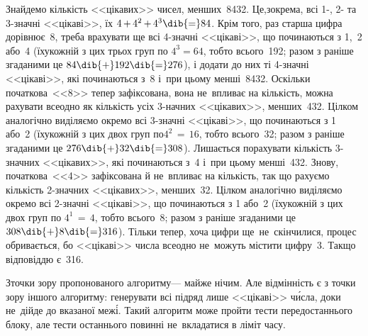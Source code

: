 Знайдемо кількість <<цікавих>> чисел, менших~8432.
Це,\nolinebreak[3] зокрема, всі 1-, 2- та \mbox{3-значні} <<цікаві>>, їх ${4\,{+}\,4^2\,{+}\,4^3}\dib{{=}}84$.
Крім того, раз старша цифра дорівнює~8, треба врахувати ще всі \mbox{4-значні} <<цікаві>>, що починаються з 1,~2 або~4 (їх\nolinebreak[3] у\nolinebreak[2] кожній з цих трьох груп по $4^3{=}64$, тобто всього~192; разом з раніше згаданими це $84\dib{{+}}192\dib{{=}}276$), і додати до них ті \mbox{4-значні} <<цікаві>>, які починаються з~8 і~при цьому менші~8432. Оскільки початкова~<<8>> тепер зафіксована, вона не~впливає на кількість, можна рахувати все\nolinebreak[2] одно як кількість усіх \mbox{3-нач}\-них <<цікавих>>, менших~432. Цілком аналогічно виділяємо окремо всі \mbox{3-значні} <<цікаві>>, що починаються з 1 або~2 (їх\nolinebreak[3] у\nolinebreak[2] кожній з цих двох груп по\nolinebreak[2] ${4^2\,{=}\,16}$, тобто всього~32; разом з раніше згаданими це $276\dib{{+}}32\dib{{=}}308$). Лишається порахувати кількість \mbox{3-знач}\-них <<цікавих>>, які починаються з~4 і~при цьому менші~432. Знову, початкова~<<4>> зафіксована й не~впливає на кількість, так що рахуємо кількість 2-значних <<цікавих>>, менших~32. Цілком аналогічно виділяємо окремо всі \mbox{2-значні} <<цікаві>>, що починаються з 1 або~2 (їх\nolinebreak[3] у\nolinebreak[2] кожній з цих двох груп по ${4^1\,{=}\,4}$, тобто всього~8; разом з раніше згаданими це $308\dib{{+}}8\dib{{=}}316$). Тільки тепер, хоча цифри ще~не~скінчилися, процес обривається, бо <<цікаві>> числа все\nolinebreak[3] одно не~можуть містити цифру~3. Так\nolinebreak[3] що відповіддю є~316.

З\nolinebreak[3] точки зору пропонованого алгоритму\nolinebreak[3] --- майже нічим. Але відмінність є з точки зору іншого алгоритму: генерувати всі підряд лише <<цікаві>> ч\'{и}сла, доки не~дійде до вказаної меж\'{і}. Такий алгоритм може пройти тести передостаннього блоку, але тести останнього повинні не~вкладатися в ліміт часу.